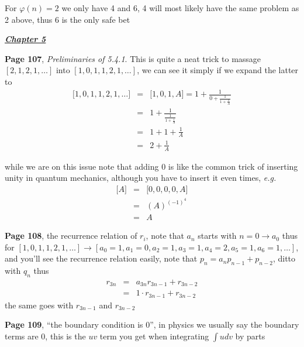 \documentclass[aps,preprint,preprintnumbers,nofootinbib,showpacs,prd]{revtex4-1}
\newcommand{\eg}{{\it e.g.} }
\newcommand{\nbea}{\begin{eqnarray*}}
\newcommand{\neea}{\end{eqnarray*}}
\begin{document}
For $\varphi(n)=2$ we only have 4 and 6, 4 will most likely have the same problem as 2 above, thus $6$ is the only safe bet

\bigskip
\underline{\textbf{\textit{Chapter 5}}}
\bigskip

{\bf Page 107}, {\it Preliminaries of 5.4.1}. This is quite a neat trick to massage $[2,1,2,1,\dots]$ into $[1,0,1,1,2,1,\dots]$, we can see it simply if we expand the latter to
%
\nbea
\lbrack 1,0,1,1,2,1,\dots\rbrack & = & \lbrack 1,0,1,A\rbrack = 1 + \frac{1}{0 + \frac{1}{1 + \frac{1}{A}}} \\
& = & 1 + \frac{1}{\frac{1}{1 + \frac{1}{A}}} \\
& = & 1 + 1 + \frac{1}{A} \\
& = & 2 + \frac{1}{A}
\neea
%

while we are on this issue note that adding $0$ is like the common trick of inserting unity in quantum mechanics, although you have to insert it even times, \eg
%
\nbea
\lbrack A \rbrack & = & \lbrack 0,0,0,0,A \rbrack \\
& = & (A)^{(-1)^4} \\
& = & A
\neea
%

{\bf Page 108}, the recurrence relation of $r_i$, note that $a_n$ starts with $n = 0 \to a_0$ thus for $[1,0,1,1,2,1,\dots] \to [a_0 = 1, a_1 = 0, a_2=1, a_3 = 1, a_4 = 2, a_5=1, a_6=1, \dots]$, and you'll see the recurrence relation easily, note that $p_n = a_np_{n-1} + p_{n-2}$, ditto with $q_n$ thus
%
\nbea
r_{3n} & = & a_{3n}r_{3n-1} + r_{3n-2} \\
& = & 1 \cdot r_{3n-1} + r_{3n-2}
\neea
%
the same goes with $r_{3n-1}$ and $r_{3n-2}$

{\bf Page 109}, ``the boundary condition is 0'', in physics we usually say the boundary terms are 0, this is the $uv$ term you get when integrating $\int udv$ by parts
\end{document}
